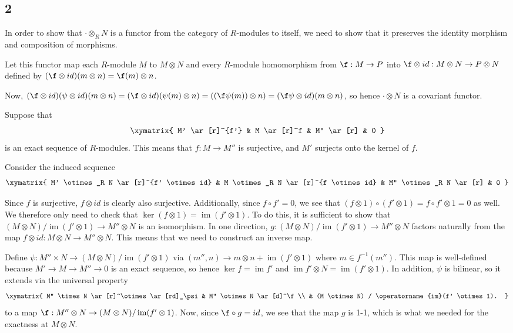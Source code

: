 \documentclass[12pt, reqno]{amsart}
\begin{document}
\subsection*{2}

In order to show that $\cdot \otimes_R N$ is a functor from the category of
$R$-modules to itself, we need to show that it preserves the identity morphism
and composition of morphisms. 

Let this functor map each $R$-module $M$ to $M \otimes N$ and every $R$-module
homomorphism from $\f : M \to P$ into 
$\f \otimes id: M \otimes N \to P \otimes N$ defined by 
$(\f \otimes id) (m \otimes n) = \f(m) \otimes n$.

Now, 
$(\f \otimes id) (\psi \otimes id) (m \otimes n)
	= (\f \otimes id) (\psi(m) \otimes n) 
		= ((\f \psi (m)) \otimes n)
			= (\f \psi \otimes id)(m \otimes n)$, 
so hence $\cdot \otimes N$ is a covariant functor.

Suppose that 
\[ 
\xymatrix{
M' \ar[r]^{f'} & M \ar[r]^f & M'' \ar[r] & 0 
}
\] 
is an exact sequence of $R$-modules. This means that $f: M \to M''$ is
surjective, and $M'$ surjects onto the kernel of $f$. 

Consider the induced sequence
\[ 
\xymatrix{
M' \otimes_R N \ar[r]^{f' \otimes id} 
	& M \otimes_R N \ar[r]^{f \otimes id} 
		& M'' \otimes_R N \ar[r] 
			& 0 
}
\] 

\def\im{\operatorname{im}}

Since $f$ is surjective, $f \otimes id$ is clearly also surjective.
Additionally, since $f \circ f' = 0$, we see that 
$(f \otimes 1) \circ (f' \otimes 1) = f \circ f' \otimes 1 = 0$ as well. We
therefore only need to check that 
$\ker (f \otimes 1) = \im (f' \otimes 1)$.
To do this, it is sufficient to show that 
$(M \otimes N) / \im(f' \otimes 1) \to M'' \otimes N$ 
is an isomorphism. 
In one direction, $g: (M \otimes N) / \im(f' \otimes 1) \to M'' \otimes N$
factors naturally from the map $f \otimes id : M \otimes N \to M'' \otimes N$.
This means that we need to construct an inverse map. 

Define $\psi : M '' \times N \to (M \otimes N) / \im(f' \otimes 1)$ via
$(m'', n) \to m \otimes n + \im (f' \otimes 1)$ where $m \in f^{-1} (m'')$.
This map is well-defined because $M' \to M \to M'' \to 0$ is an exact sequence,
so hence $\ker f = \im f'$ and $\im f' \otimes N = \im (f' \otimes 1)$.
In addition, $\psi$ is bilinear, so it extends via the universal property
\[ 
\xymatrix{
M'' \times N \ar[r]^\otimes \ar[rd]_\psi
	& M'' \otimes N \ar[d]^\f \\
& (M \otimes N) / \im (f' \otimes 1).
}
\] 
to a map $\f : M'' \otimes N \to (M \otimes N) / \im(f' \otimes 1)$.
Now, since $\f \circ g = id$, we see that the map $g$ is 1-1, which is what we
needed for the exactness at $M \otimes N$.
\end{document}
